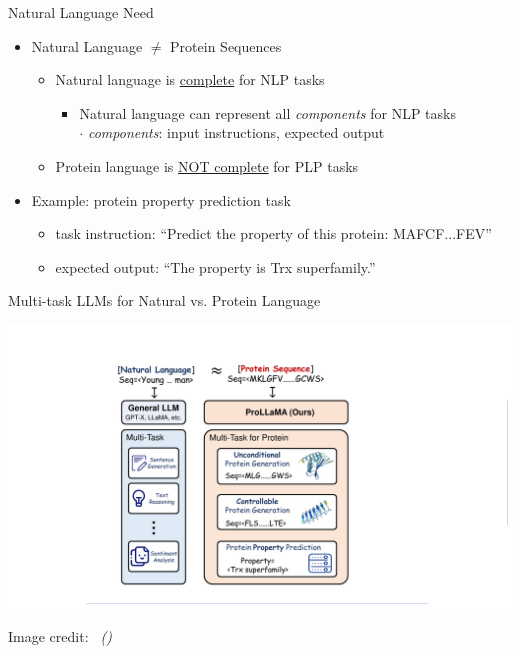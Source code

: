 \documentclass[dvipsnames,
hyperref={citecolor=blue}
]{beamer}
\newcommand{\credit}[2]{{\par\hfill \tiny #1 credit:~\itshape{\color{blue} \citeauthor{#2} (\citeyear{#2})}}}
\begin{document}
\begin{frame}{Natural Language Need}
	\begin{itemize}\setlength\itemsep{3em}
		\item Natural Language $\neq$ Protein Sequences
		\begin{itemize}\setlength\itemsep{1em}
			\item Natural language is \underline{complete} for NLP tasks
			\begin{itemize}
				\item Natural language can represent all \emph{components} for NLP tasks
				\\$\cdot$ \emph{components}: input instructions, expected output
			\end{itemize}
			\item Protein language is \underline{NOT complete} for PLP tasks
		\end{itemize}
		\item Example: protein property prediction task
		\begin{itemize}
			\item task instruction: ``Predict the property of this protein: MAFCF...FEV''
			\item expected output: ``The property is Trx superfamily.''
		\end{itemize}
	\end{itemize}
\end{frame}

\begin{frame}{Multi-task LLMs for Natural vs. Protein Language}
	\begin{center}
		\includegraphics[scale=0.5]{images/multitask_LLMs_NLP_vs_PLP.pdf}
	\end{center}
	\credit{Image}{lv2024prollama}
\end{frame}
\end{document}
